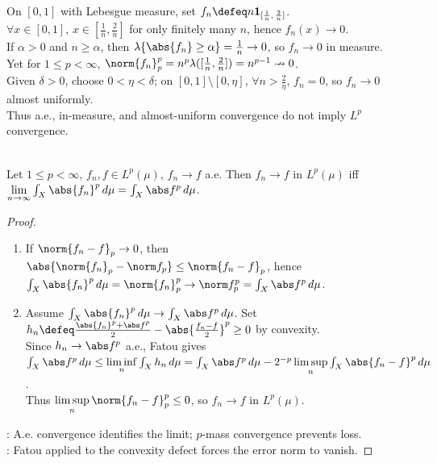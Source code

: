 \begin{example} \label{ex:modes-ae-measure-not-lp-finite-measure} \\
On $[0,1]$ with Lebesgue measure, set $f_n\defeq n\mathbf{1}_{[\frac{1}{n},\,\frac{2}{n}]}$.\\
$\forall x\in[0,1]$, $x\in[\frac{1}{n},\frac{2}{n}]$ for only finitely many $n$, hence $f_n(x)\to0$.\\
If $\alpha>0$ and $n\geq\alpha$, then $\lambda\{\abs{f_n}\geq\alpha\}=\frac{1}{n}\to0$, so $f_n\to0$ in measure.\\
Yet for $1\leq p<\infty$, $\norm{f_n}_p^p=n^p\lambda([\frac{1}{n},\frac{2}{n}])=n^{p-1}\nrightarrow0$.\\
Given $\delta>0$, choose $0<\eta<\delta$; on $[0,1]\setminus[0,\eta]$, $\forall n>\frac{2}{\eta}$, $f_n=0$, so $f_n\to0$ almost uniformly.\\
Thus a.e., in-measure, and almost-uniform convergence do not imply $L^p$ convergence.
\end{example}

\begin{theorem} \label{thm:pointwise-ae-norms-characterize-lp-convergence} \\
Let $1\leq p<\infty$, $f_n,f\in L^p(\mu)$, $f_n\to f$ a.e. Then
$f_n\to f$ in $L^p(\mu)$ iff $\lim\limits_{n\to\infty}\int_X\abs{f_n}^p\,d\mu=\int_X\abs f^p\,d\mu$.
\begin{proof}
\begin{enumerate}[label=\roman*.]
\setlength{\itemsep}{0pt}
\item[$(\Rightarrow)$] If $\norm{f_n-f}_p\to0$, then $\abs{\norm{f_n}_p-\norm f_p}\leq\norm{f_n-f}_p$, hence $\int_X\abs{f_n}^p\,d\mu=\norm{f_n}_p^p\to\norm f_p^p=\int_X\abs f^p\,d\mu$.
\item[$(\Leftarrow)$] Assume $\int_X\abs{f_n}^p\,d\mu\to\int_X\abs f^p\,d\mu$. Set $h_n\defeq\frac{\abs{f_n}^p+\abs f^p}{2}-\abs{\frac{f_n-f}{2}}^p\geq0$ by convexity.\\
Since $h_n\to\abs f^p$ a.e., Fatou gives $\int_X\abs f^p\,d\mu\leq\liminf\limits_n\int_Xh_n\,d\mu=\int_X\abs f^p\,d\mu-2^{-p}\limsup\limits_n\int_X\abs{f_n-f}^p\,d\mu$.\\
Thus $\limsup\limits_n\norm{f_n-f}_p^p\leq0$, so $f_n\to f$ in $L^p(\mu)$.
\end{enumerate}
: A.e. convergence identifies the limit; $p$-mass convergence prevents loss.\\
: Fatou applied to the convexity defect forces the error norm to vanish.
\end{proof}
\end{theorem}

